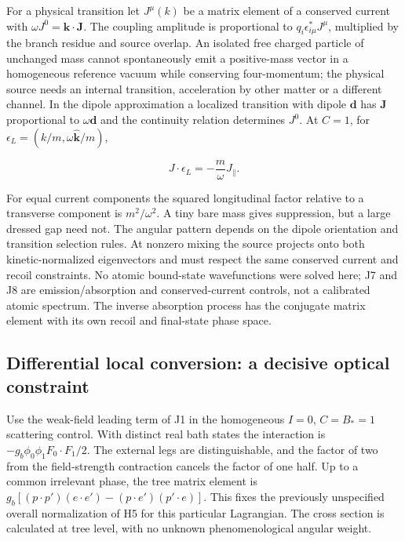 \documentclass[
  11pt,
  twoside]{article}
\begin{document}
For a physical transition let \(J^\mu(k)\) be a matrix element of a
conserved current with \(\omega J^0=\mathbf k\cdot\mathbf J\). The
coupling amplitude is proportional to \(q_i\epsilon_{i\mu}^* J^\mu\),
multiplied by the branch residue and source overlap. An isolated free
charged particle of unchanged mass cannot spontaneously emit a
positive-mass vector in a homogeneous reference vacuum while conserving
four-momentum; the physical source needs an internal transition,
acceleration by other matter or a different channel. In the dipole
approximation a localized transition with dipole \(\mathbf d\) has
\(\mathbf J\) proportional to \(\omega\mathbf d\) and the continuity
relation determines \(J^0\). At \(C=1\), for
\(\epsilon_L=(k/m,\omega\hat{\mathbf k}/m)\),

\[ J\cdot\epsilon_L=-\frac{m}{\omega}J_\parallel.\tag{J8}\]

For equal current components the squared longitudinal factor relative to
a transverse component is \(m^2/\omega^2\). A tiny bare mass gives
suppression, but a large dressed gap need not. The angular pattern
depends on the dipole orientation and transition selection rules. At
nonzero mixing the source projects onto both kinetic-normalized
eigenvectors and must respect the same conserved current and recoil
constraints. No atomic bound-state wavefunctions were solved here; J7
and J8 are emission/absorption and conserved-current controls, not a
calibrated atomic spectrum. The inverse absorption process has the
conjugate matrix element with its own recoil and final-state phase
space.

\subsection{Differential local conversion: a decisive optical
constraint}\label{differential-local-conversion-a-decisive-optical-constraint}

Use the weak-field leading term of J1 in the homogeneous \(I=0\),
\(C=B_*=1\) scattering control. With distinct real bath states the
interaction is \(-g_b\phi_0\phi_1F_0\cdot F_1/2\). The external legs are
distinguishable, and the factor of two from the field-strength
contraction cancels the factor of one half. Up to a common irrelevant
phase, the tree matrix element is
\(g_b[(p\cdot p')(e\cdot e')-(p\cdot e')(p'\cdot e)]\). This fixes the
previously unspecified overall normalization of H5 for this particular
Lagrangian. The cross section is calculated at tree level, with no
unknown phenomenological angular weight.
\end{document}
